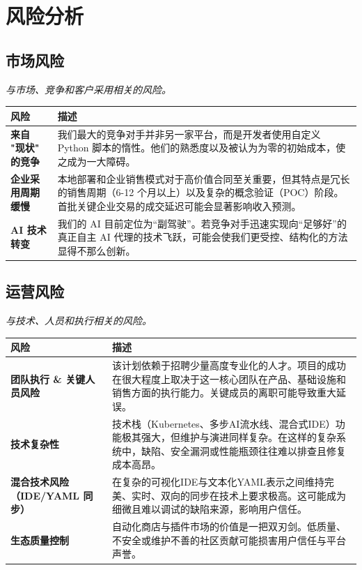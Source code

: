 \documentclass[11pt, a4paper, oneside]{article}
\begin{document}
\newpage
\section{风险分析}
\subsection{市场风险}
\textit{与市场、竞争和客户采用相关的风险。}

\begin{table}[H]
\centering
\begin{tabularx}{\textwidth}{@{}lL@{}}
\toprule
\textbf{风险} & \textbf{描述} \\
\midrule
\textbf{来自 "现状" 的竞争} & 我们最大的竞争对手并非另一家平台，而是开发者使用自定义 Python 脚本的惰性。他们的熟悉度以及被认为为零的初始成本，使之成为一大障碍。 \\
\addlinespace
\textbf{企业采用周期缓慢} & 本地部署和企业销售模式对于高价值合同至关重要，但其特点是冗长的销售周期（6-12 个月以上）以及复杂的概念验证（POC）阶段。首批关键企业交易的成交延迟可能会显著影响收入预测。 \\
\addlinespace
\textbf{AI 技术转变} & 我们的 AI 目前定位为“副驾驶”。若竞争对手迅速实现向“足够好”的真正自主 AI 代理的技术飞跃，可能会使我们更受控、结构化的方法显得不那么创新。 \\
\bottomrule
\end{tabularx}
\end{table}

\newpage
\subsection{运营风险}
\textit{与技术、人员和执行相关的风险。}

\begin{table}[H]
\centering
\begin{tabularx}{\textwidth}{@{}lL@{}}
\toprule
\textbf{风险} & \textbf{描述} \\
\midrule
\textbf{团队执行 \& 关键人员风险} & 该计划依赖于招聘少量高度专业化的人才。项目的成功在很大程度上取决于这一核心团队在产品、基础设施和销售方面的执行能力。关键成员的离职可能导致重大延误。 \\



\addlinespace
\textbf{技术复杂性} & 技术栈（Kubernetes、多步AI流水线、混合式IDE）功能极其强大，但维护与演进同样复杂。在这样的复杂系统中，缺陷、安全漏洞或性能瓶颈往往难以排查且修复成本高昂。 \\
\addlinespace
\textbf{混合技术风险（IDE/YAML 同步）} & 在复杂的可视化IDE与文本化YAML表示之间维持完美、实时、双向的同步在技术上要求极高。这可能成为细微且难以调试的缺陷来源，影响用户信任。 \\
\addlinespace
\textbf{生态质量控制} & 自动化商店与插件市场的价值是一把双刃剑。低质量、不安全或维护不善的社区贡献可能损害用户信任与平台声誉。 \\
\bottomrule
\end{tabularx}
\end{table}
\end{document}
